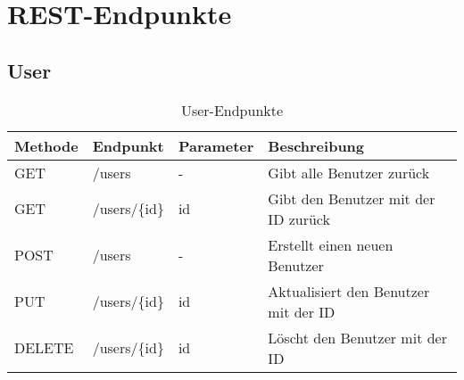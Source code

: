 \chapter{\ac{REST}-Endpunkte}

\section{User}

\begin{table}[!h]
    \centering
    \begin{tabular}{|l|l|l|l|}
        \hline
        \textbf{Methode} & \textbf{Endpunkt} & \textbf{Parameter} & \textbf{Beschreibung} \\
        \hline
        GET & /users & - & Gibt alle Benutzer zurück \\
        \hline
        GET & /users/\{id\} & id & Gibt den Benutzer mit der ID zurück \\
        \hline
        POST & /users & - & Erstellt einen neuen Benutzer \\
        \hline
        PUT & /users/\{id\} & id & Aktualisiert den Benutzer mit der ID \\
        \hline
        DELETE & /users/\{id\} & id & Löscht den Benutzer mit der ID \\
        \hline
    \end{tabular}
    \caption{User-Endpunkte}
\end{table}
